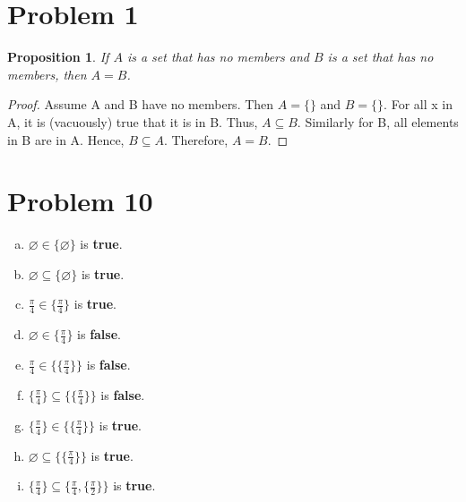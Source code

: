 \documentclass{article}
\let\emptyset\varnothing
\newcounter{count}
\newtheorem{prop}{Proposition}[count]
\begin{document}
\section*{Problem 1}

\begin{prop}
  If $A$ is a set that has no members and $B$ is a set that has no members, then $A = B$.
\end{prop}
\begin{proof}
Assume A and B have no members. Then $A = \{ \}$ and $B = \{ \}$. For all x in A, it is (vacuously) true that it is in B. Thus, $A \subseteq B$. Similarly for B, all elements in B are in A. Hence, $B \subseteq A$. Therefore, $A = B$.
\end{proof}

\section*{Problem 10}
\begin{multicols}{2}
  \begin{enumerate}[a)]
  \item $\emptyset \in \{ \emptyset \}$ is \textbf{true}.
  \item $\emptyset \subseteq \{ \emptyset \}$ is \textbf{true}.
  \item $\frac{\pi}{4} \in \{ \frac{\pi}{4} \}$ is \textbf{true}.
  \item $\emptyset \in \{ \frac{\pi}{4} \} $ is \textbf{false}.
  \item $\frac{\pi}{4} \in \{ \{ \frac{\pi}{4} \} \} $ is \textbf{false}.
  \item $\{ \frac{\pi}{4} \} \subseteq \{ \{ \frac{\pi}{4} \}\}$ is \textbf{false}.
  \item $\{ \frac{\pi}{4} \} \in \{ \{ \frac{\pi}{4} \}\}$ is \textbf{true}.
  \item $\emptyset \subseteq \{ \{ \frac{\pi}{4} \} \}$ is \textbf{true}.
  \item $\{ \frac{\pi}{4} \} \subseteq \{ \frac{\pi}{4}, \{ \frac{\pi}{2} \} \}$ is \textbf{true}.
  \end{enumerate}
\end{multicols}
\end{document}
